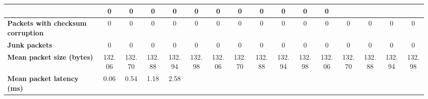 \begin{table}[!h]
{\begin{tabular}{|l|ccccc|ccccc|ccccc|}
            & \multicolumn{1}{c|}{0}
            & \multicolumn{1}{c|}{0}
            & \multicolumn{1}{c|}{0}
            & \multicolumn{1}{c|}{0}
            & \multicolumn{1}{c|}{0}
            & \multicolumn{1}{c|}{0}
            & \multicolumn{1}{c|}{0}
            & \multicolumn{1}{c|}{0}
            & \multicolumn{1}{c|}{0}
            & \multicolumn{1}{c|}{0}
            & \multicolumn{1}{c|}{0}
            \\ \hline
            \textbf{Packets with checksum corruption} & \multicolumn{1}{c|}{0} & \multicolumn{1}{c|}{0}
            & \multicolumn{1}{c|}{0}
            & \multicolumn{1}{c|}{0}
            & \multicolumn{1}{c|}{0}
            & \multicolumn{1}{c|}{0}
            & \multicolumn{1}{c|}{0}
            & \multicolumn{1}{c|}{0}
            & \multicolumn{1}{c|}{0}
            & \multicolumn{1}{c|}{0}
            & \multicolumn{1}{c|}{0}
            & \multicolumn{1}{c|}{0}
            & \multicolumn{1}{c|}{0}
            & \multicolumn{1}{c|}{0}
            & \multicolumn{1}{c|}{0}
            \\ \hline
            \textbf{Junk packets} & \multicolumn{1}{c|}{0} & \multicolumn{1}{c|}{0}
            & \multicolumn{1}{c|}{0}
            & \multicolumn{1}{c|}{0}
            & \multicolumn{1}{c|}{0}
            & \multicolumn{1}{c|}{0}
            & \multicolumn{1}{c|}{0}
            & \multicolumn{1}{c|}{0}
            & \multicolumn{1}{c|}{0}
            & \multicolumn{1}{c|}{0}
            & \multicolumn{1}{c|}{0}
            & \multicolumn{1}{c|}{0}
            & \multicolumn{1}{c|}{0}
            & \multicolumn{1}{c|}{0}
            & \multicolumn{1}{c|}{0}
            \\ \hline
            \textbf{Mean packet size (bytes)} & \multicolumn{1}{c|}{132.06} & \multicolumn{1}{c|}{132.70}
            & \multicolumn{1}{c|}{132.88}
            & \multicolumn{1}{c|}{132.94}
            & \multicolumn{1}{c|}{132.98}
            & \multicolumn{1}{c|}{132.06}
            & \multicolumn{1}{c|}{132.70}
            & \multicolumn{1}{c|}{132.88}
            & \multicolumn{1}{c|}{132.94}
            & \multicolumn{1}{c|}{132.98}
            & \multicolumn{1}{c|}{132.06}
            & \multicolumn{1}{c|}{132.70}
            & \multicolumn{1}{c|}{132.88}
            & \multicolumn{1}{c|}{132.94}
            & \multicolumn{1}{c|}{132.98}
            \\ \hline
            \textbf{Mean packet latency (ms)} & \multicolumn{1}{c|}{0.06} & \multicolumn{1}{c|}{0.54}
            & \multicolumn{1}{c|}{1.18}
            & \multicolumn{1}{c|}{2.58}

\end{tabular}}
\end{table}
